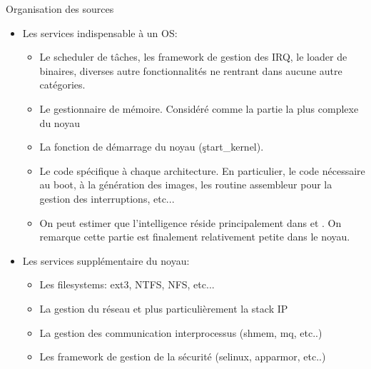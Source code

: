 \begin{frame}[fragile=singleslide]{Organisation des sources}
  \begin{itemize} 
  \item Les services indispensable à un OS:
    \begin{itemize} 
    \item  {}  Le scheduler  de  tâches,  les framework  de
      gestion  des   IRQ,  le  loader  de   binaires,  diverses  autre
      fonctionnalités ne rentrant dans aucune autre catégories.
    \item  {} Le  gestionnaire de  mémoire. Considéré  comme la
      partie la plus complexe du noyau
    \item   {}   La    fonction   de   démarrage   du   noyau
      (\c{start_kernel}).
    \item  {} Le  code spécifique  à chaque  architecture. En
      particulier,  le code nécessaire  au boot,  à la  génération des
      images,   les   routine   assembleur   pour   la   gestion   des
      interruptions, etc...
    \item  On peut  estimer que  l'intelligence  réside principalement
      dans   et .  On remarque cette  partie est
      finalement relativement petite dans le noyau.
    \end{itemize} 
  \item Les services supplémentaire du noyau:
    \begin{itemize}
    \item {} Les filesystems: ext3, NTFS, NFS, etc...
    \item {} La gestion  du réseau et plus particulièrement la
      stack IP
    \item  {}  La  gestion  des  communication  interprocessus
      (shmem, mq, etc..)
    \item  {} Les  framework  de gestion  de la  sécurité
      (selinux, apparmor,  etc..)  
    \end{itemize} 
  \end{itemize}  
\end{frame}

